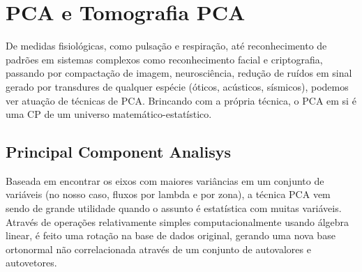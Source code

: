 


\chapter{PCA e Tomografia PCA}
\label{sec:PCAeTomoPCA}

De medidas fisiológicas, como pulsação e respiração, até reconhecimento de
padrões em sistemas complexos como reconhecimento facial e criptografia,
passando por compactação de imagem, neurosciência, redução de ruídos em sinal
gerado por transdures de qualquer espécie (óticos, acústicos, sísmicos), podemos ver
atuação de técnicas de PCA. \ojo Brincando com a própria técnica, o PCA em si é
uma CP de um universo matemático-estatístico.


\section{Principal Component Analisys}
\label{sec:PCAeTomoPCA:PCA}

Baseada em encontrar os eixos com maiores variâncias em um conjunto de variáveis
(no nosso caso, fluxos por lambda e por zona), a técnica PCA vem sendo de grande
utilidade quando o assunto é estatística com muitas variáveis. Através de
operações relativamente simples computacionalmente usando álgebra linear, é
feito uma rotação na base de dados original, gerando uma nova base ortonormal
não correlacionada através de um conjunto de autovalores e autovetores.

